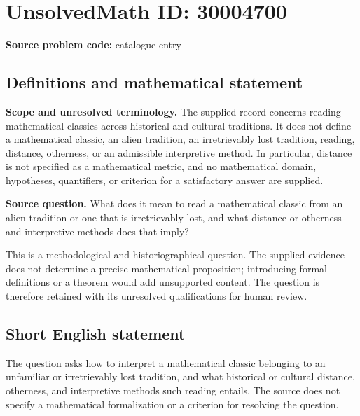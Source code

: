 \documentclass[11pt]{article}
\begin{document}
\section*{UnsolvedMath ID: 30004700}
\textbf{Source problem code:} catalogue entry
\subsection{Definitions and mathematical statement}
\textbf{Scope and unresolved terminology.} The supplied record concerns reading mathematical classics across historical and cultural traditions. It does not define a mathematical classic, an alien tradition, an irretrievably lost tradition, reading, distance, otherness, or an admissible interpretive method. In particular, distance is not specified as a mathematical metric, and no mathematical domain, hypotheses, quantifiers, or criterion for a satisfactory answer are supplied.

\textbf{Source question.} What does it mean to read a mathematical classic from an alien tradition or one that is irretrievably lost, and what distance or otherness and interpretive methods does that imply?

This is a methodological and historiographical question. The supplied evidence does not determine a precise mathematical proposition; introducing formal definitions or a theorem would add unsupported content. The question is therefore retained with its unresolved qualifications for human review.
\subsection{Short English statement}
The question asks how to interpret a mathematical classic belonging to an unfamiliar or irretrievably lost tradition, and what historical or cultural distance, otherness, and interpretive methods such reading entails. The source does not specify a mathematical formalization or a criterion for resolving the question.
\end{document}
